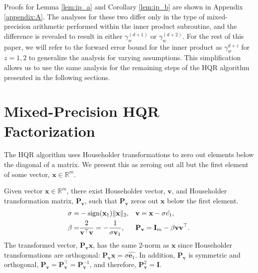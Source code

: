 \documentclass[review,onefignum,onetabnum]{siamart190516}
\newcommand{\R}{\mathbb{R}}
\newcommand{\bb}[1]{\mathbf{#1}}
\begin{document}
Proofs for Lemma \ref{lem:ip_a} and Corollary \ref{lem:ip_b} are shown in Appendix \ref{appendix:A}.
The analyses for these two differ only in the type of mixed-precision arithmetic performed within the inner product subroutine, and the difference is revealed to result in either $\gamma_w^{(d+1)}$ or $\gamma_w^{(d+2)}$.
For the rest of this paper, we will refer to the forward error bound for the inner product as $\gamma_w^{d+z}$ for $z=1,2$ to generalize the analysis for varying assumptions.
This simplification allows us to use the same analysis for the remaining steps of the HQR algorithm presented in the following sections.

\section{Mixed-Precision HQR Factorization}
\label{sec:HQRf}

The HQR algorithm uses %
Householder transformations to zero out elements below the diagonal of a matrix. 
We present this %
as zeroing out all but the first element of some vector, $\bb{x}\in\R^m$.


\begin{lemma}
	Given vector $\bb{x}\in\R^{m}$, there exist Householder vector, $\bb{v}$, and Householder transformation matrix, $\bb{P}_{\bb{v}}$, such that $\bb{P}_{\bb{v}}$ zeros out $\bb{x}$ below the first element. 
	\begin{equation}
	\begin{alignedat}{3} 
	\sigma =& -\rm{sign}(\bb{x}_1)\|\bb{x}\|_2, &&\quad  \bb{v} = \bb{x} -\sigma \hat{e_1},\\
	\beta = & \frac{2}{\bb{v}^{\top}\bb{v}}=-\frac{1}{\sigma\bb{v}_1}, && \quad \bb{P}_{\bb{v}}=  \bb{I}_{m} - \beta \bb{v}\bb{v}^{\top}.
	\end{alignedat}
	\label{eqn:HH} 
	\end{equation}
	The transformed vector, $\bb{P_vx}$, has the same 2-norm as $\bb{x}$ since Householder transformations are orthogonal: $\bb{P}_{\bb{v}}\bb{x} = \sigma\hat{\bb{e}_1}$.
	In addition, $\bb{P}_{\bb{v}}$ is symmetric and orthogonal, $\bb{P}_{\bb{v}}=\bb{P}_{\bb{v}}^{\top}=\bb{P}_{\bb{v}}^{-1}$, and therefore, $\bb{P}_{\bb{v}}^2=\bb{I}$.
	\label{lem:hhvec}
\end{lemma}
\end{document}
